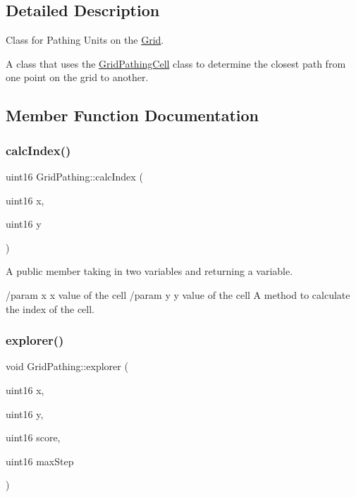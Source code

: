 \subsection{Detailed Description}
Class for Pathing Units on the \hyperlink{class_grid}{Grid}. 

A class that uses the \hyperlink{class_grid_pathing_cell}{Grid\+Pathing\+Cell} class to determine the closest path from one point on the grid to another. 

\subsection{Member Function Documentation}
\hypertarget{class_grid_pathing_aa7d6f9ce481bf8148d778419dfc5947b}{}\label{class_grid_pathing_aa7d6f9ce481bf8148d778419dfc5947b} 
\subsubsection{\texorpdfstring{calc\+Index()}{calcIndex()}}
{\footnotesize\ttfamily uint16 Grid\+Pathing\+::calc\+Index (\begin{DoxyParamCaption}\item[{uint16}]{x,  }\item[{uint16}]{y }\end{DoxyParamCaption})}



A public member taking in two variables and returning a variable. 

/param x x value of the cell /param y y value of the cell A method to calculate the index of the cell. \hypertarget{class_grid_pathing_a0d4652be2afba5e6363af1459a8720d2}{}\label{class_grid_pathing_a0d4652be2afba5e6363af1459a8720d2} 
\subsubsection{\texorpdfstring{explorer()}{explorer()}}
{\footnotesize\ttfamily void Grid\+Pathing\+::explorer (\begin{DoxyParamCaption}\item[{uint16}]{x,  }\item[{uint16}]{y,  }\item[{uint16}]{score,  }\item[{uint16}]{max\+Step }\end{DoxyParamCaption})}



